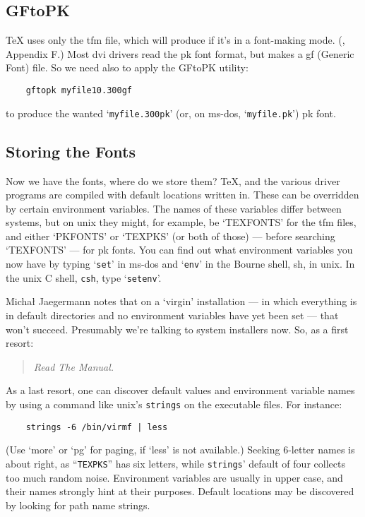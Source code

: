 \subsection{{\sf GFtoPK}}\label{sub:gftopk}

\TeX{} uses only the {\sc tfm} file, which \MF{}
will produce if it's in a font-making mode.
(\MFbook{}, Appendix F.)
Most {\sc dvi} drivers read the {\sc pk} font format,
but \MF{} makes a {\sc gf} (Generic Font) file.
So we need also to apply the {\sf GFtoPK} utility:
\begin{verbatim}
    gftopk myfile10.300gf
\end{verbatim}
to produce the wanted `{\tt myfile.300pk}'
(or, on {\sc ms-dos}, `{\tt myfile.pk}')
{\sc pk} font.


\subsection{Storing the Fonts}\label{sub:store}

Now we have the fonts, where do we store them?  \TeX{}, \MF{} and
the various driver programs are compiled with default locations
written in.
These can be overridden by certain environment variables.
The names of these variables differ between systems,
but on {\sc unix} they might, for example, be `TEXFONTS' for the
{\sc tfm} files, and either `PKFONTS' or `TEXPKS' (or both of those)
--- before searching `TEXFONTS' --- for {\sc pk} fonts.
You can find out what environment variables you now have
by typing `{\tt set}' in {\sc ms-dos} and `{\tt env}' in the Bourne shell, sh,
in {\sc unix}.  In the {\sc unix} C shell, {\tt csh}, type
`{\tt setenv}'.

Micha{\l} {\sc Jaegermann} notes that on a `virgin' installation
--- in which everything is in default directories and no environment
variables have yet been set --- that won't succeed.  Presumably we're
talking to system installers now.  So, as a first resort:
\begin{quote}
    \em Read The Manual.
\end{quote}
As a last resort, one can discover default values and environment
variable names by using a command like {\sc unix}'s {\tt strings}
on the executable files.
For instance:
\begin{verbatim}
    strings -6 /bin/virmf | less
\end{verbatim}
(Use `more' or `pg' for paging, if `less' is not available.)
Seeking 6-letter names is about right, as ``{\tt TEXPKS}'' has six
letters, while {\tt strings\/}' default of four collects too much
random noise.
Environment variables are usually in upper case, and their names
strongly hint at their purposes.
Default locations may be discovered by looking for path name strings.

